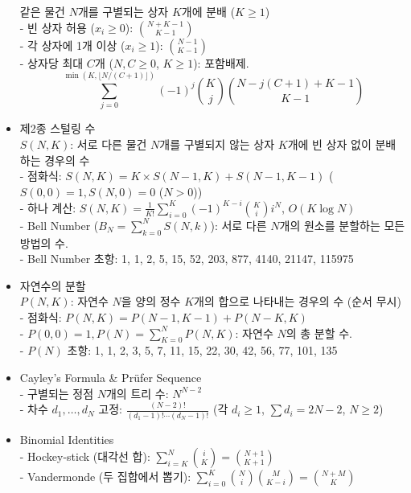 \documentclass[landscape, 8pt, a4paper, oneside]{extarticle}
\begin{document}
\begin{multicols*}{3}
\begin{itemize}
    같은 물건 $N$개를 구별되는 상자 $K$개에 분배 ($K\ge1$)\\
    - 빈 상자 허용 ($x_i\ge0$): $\binom{N+K-1}{K-1}$\\
    - 각 상자에 1개 이상 ($x_i\ge1$): $\binom{N-1}{K-1}$\\
    - 상자당 최대 $C$개 ($N,C \ge 0$, $K \ge 1$): 포함배제.
    \begingroup
    \setlength{\abovedisplayskip}{2pt}
    \setlength{\belowdisplayskip}{2pt}
    \setlength{\abovedisplayshortskip}{2pt}
    \setlength{\belowdisplayshortskip}{2pt}
    \[
    \sum_{j=0}^{\min(K,\lfloor N/(C+1)\rfloor)}
    (-1)^j \binom{K}{j}
    \binom{N-j(C+1)+K-1}{K-1}
    \]
    \endgroup
    \item 제2종 스털링 수\\
    $S(N,K)$: 서로 다른 물건 $N$개를 구별되지 않는 상자 $K$개에 빈 상자 없이 분배하는 경우의 수\\
    - 점화식: $S(N, K) = K \times S(N-1, K) + S(N-1, K-1)$ ($S(0,0)=1, S(N,0)=0$ ($N>0$))\\
    - 하나 계산: $S(N,K)=\frac{1}{K!}\sum_{i=0}^K(-1)^{K-i}\binom{K}{i}i^N$, $O(K\log N)$\\
    - Bell Number ($B_N = \sum_{k=0}^N S(N, k)$): 서로 다른 $N$개의 원소를 분할하는 모든 방법의 수.\\
    - Bell Number 초항: 1, 1, 2, 5, 15, 52, 203, 877, 4140, 21147, 115975
    \item 자연수의 분할\\
    $P(N,K)$: 자연수 $N$을 양의 정수 $K$개의 합으로 나타내는 경우의 수 (순서 무시)\\
    - 점화식: $P(N, K) = P(N-1, K-1) + P(N-K, K)$\\
    - $P(0,0)=1, P(N)=\sum_{K=0}^N P(N,K)$: 자연수 $N$의 총 분할 수. \\
    - $P(N)$ 초항: 1, 1, 2, 3, 5, 7, 11, 15, 22, 30, 42, 56, 77, 101, 135
    \item Cayley's Formula \& Prüfer Sequence\\
    - 구별되는 정점 $N$개의 트리 수: $N^{N-2}$\\
    - 차수 $d_1,\ldots,d_N$ 고정: $\frac{(N-2)!}{(d_1-1)!\cdots(d_N-1)!}$ (각 $d_i\ge1$, $\sum d_i=2N-2$, $N\ge2$)
    \item Binomial Identities\\
    - Hockey-stick (대각선 합): $\sum_{i=K}^N\binom{i}{K}=\binom{N+1}{K+1}$\\
    - Vandermonde (두 집합에서 뽑기): $\sum_{i=0}^K\binom{N}{i}\binom{M}{K-i}=\binom{N+M}{K}$\\

\end{itemize}
\end{multicols*}
\end{document}
